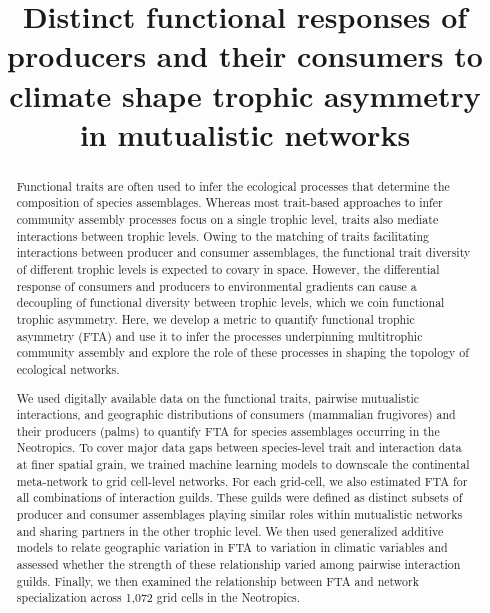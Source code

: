 \documentclass[
]{agujournal2019}
\begin{document}
\title{Distinct functional responses of producers and their consumers to
climate shape trophic asymmetry in mutualistic networks}



\begin{abstract}
Functional traits are often used to infer the ecological processes that
determine the composition of species assemblages. Whereas most
trait-based approaches to infer community assembly processes focus on a
single trophic level, traits also mediate interactions between trophic
levels. Owing to the matching of traits facilitating interactions
between producer and consumer assemblages, the functional trait
diversity of different trophic levels is expected to covary in space.
However, the differential response of consumers and producers to
environmental gradients can cause a decoupling of functional diversity
between trophic levels, which we coin functional trophic asymmetry.
Here, we develop a metric to quantify functional trophic asymmetry (FTA)
and use it to infer the processes underpinning multitrophic community
assembly and explore the role of these processes in shaping the topology
of ecological networks.

We used digitally available data on the functional traits, pairwise
mutualistic interactions, and geographic distributions of consumers
(mammalian frugivores) and their producers (palms) to quantify FTA for
species assemblages occurring in the Neotropics. To cover major data
gaps between species-level trait and interaction data at finer spatial
grain, we trained machine learning models to downscale the continental
meta-network to grid cell-level networks. For each grid-cell, we also
estimated FTA for all combinations of interaction guilds. These guilds
were defined as distinct subsets of producer and consumer assemblages
playing similar roles within mutualistic networks and sharing partners
in the other trophic level. We then used generalized additive models to
relate geographic variation in FTA to variation in climatic variables
and assessed whether the strength of these relationship varied among
pairwise interaction guilds. Finally, we then examined the relationship
between FTA and network specialization across 1,072 grid cells in the
Neotropics.


\end{abstract}
\end{document}
